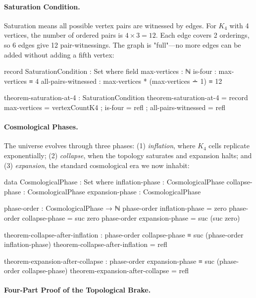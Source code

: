\documentclass[11pt,a4paper]{book}
\begin{document}
\paragraph{Saturation Condition.}

Saturation means all possible vertex pairs are witnessed by edges. For $K_4$ with 4 vertices, 
the number of ordered pairs is $4 \times 3 = 12$. Each edge covers 2 orderings, so 6 edges 
give 12 pair-witnessings. The graph is "full"—no more edges can be added without adding a 
fifth vertex:

\begin{code}
record SaturationCondition : Set where
  field
    max-vertices    : ℕ
    is-four         : max-vertices ≡ 4
    all-pairs-witnessed : max-vertices * (max-vertices ∸ 1) ≡ 12

theorem-saturation-at-4 : SaturationCondition
theorem-saturation-at-4 = record
  { max-vertices = vertexCountK4
  ; is-four = refl
  ; all-pairs-witnessed = refl
  }
\end{code}

\paragraph{Cosmological Phases.}

The universe evolves through three phases: (1) \emph{inflation}, where $K_4$ cells replicate 
exponentially; (2) \emph{collapse}, when the topology saturates and expansion halts; and 
(3) \emph{expansion}, the standard cosmological era we now inhabit:

\begin{code}
data CosmologicalPhase : Set where
  inflation-phase : CosmologicalPhase
  collapse-phase  : CosmologicalPhase
  expansion-phase : CosmologicalPhase

phase-order : CosmologicalPhase → ℕ
phase-order inflation-phase = zero
phase-order collapse-phase = suc zero
phase-order expansion-phase = suc (suc zero)

theorem-collapse-after-inflation : phase-order collapse-phase ≡ suc (phase-order inflation-phase)
theorem-collapse-after-inflation = refl

theorem-expansion-after-collapse : phase-order expansion-phase ≡ suc (phase-order collapse-phase)
theorem-expansion-after-collapse = refl
\end{code}

\paragraph{Four-Part Proof of the Topological Brake.}
\end{document}
